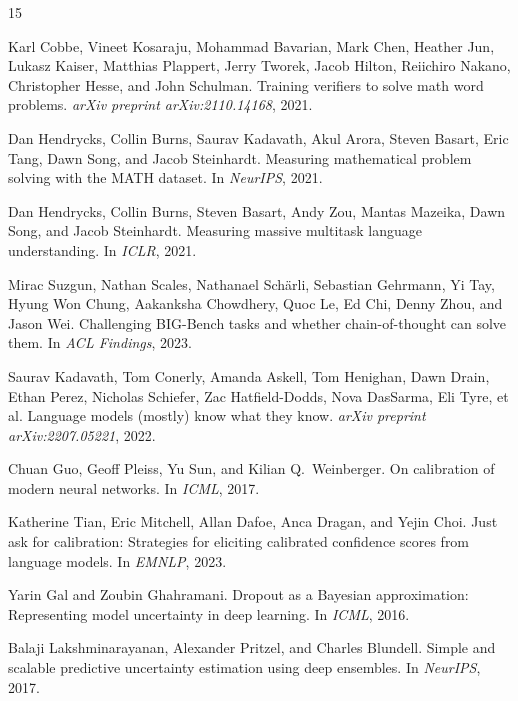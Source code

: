 \documentclass{article}
\begin{document}
\begin{thebibliography}{15}

Karl Cobbe, Vineet Kosaraju, Mohammad Bavarian, Mark Chen, Heather Jun, Lukasz Kaiser, Matthias Plappert, Jerry Tworek, Jacob Hilton, Reiichiro Nakano, Christopher Hesse, and John Schulman.
\newblock Training verifiers to solve math word problems.
\newblock \emph{arXiv preprint arXiv:2110.14168}, 2021.

Dan Hendrycks, Collin Burns, Saurav Kadavath, Akul Arora, Steven Basart, Eric Tang, Dawn Song, and Jacob Steinhardt.
\newblock Measuring mathematical problem solving with the MATH dataset.
\newblock In \emph{NeurIPS}, 2021.

Dan Hendrycks, Collin Burns, Steven Basart, Andy Zou, Mantas Mazeika, Dawn Song, and Jacob Steinhardt.
\newblock Measuring massive multitask language understanding.
\newblock In \emph{ICLR}, 2021.

Mirac Suzgun, Nathan Scales, Nathanael Sch{\"a}rli, Sebastian Gehrmann, Yi Tay, Hyung Won Chung, Aakanksha Chowdhery, Quoc Le, Ed Chi, Denny Zhou, and Jason Wei.
\newblock Challenging BIG-Bench tasks and whether chain-of-thought can solve them.
\newblock In \emph{ACL Findings}, 2023.

Saurav Kadavath, Tom Conerly, Amanda Askell, Tom Henighan, Dawn Drain, Ethan Perez, Nicholas Schiefer, Zac Hatfield-Dodds, Nova DasSarma, Eli Tyre, et al.
\newblock Language models (mostly) know what they know.
\newblock \emph{arXiv preprint arXiv:2207.05221}, 2022.

Chuan Guo, Geoff Pleiss, Yu Sun, and Kilian Q.\ Weinberger.
\newblock On calibration of modern neural networks.
\newblock In \emph{ICML}, 2017.

Katherine Tian, Eric Mitchell, Allan Dafoe, Anca Dragan, and Yejin Choi.
\newblock Just ask for calibration: Strategies for eliciting calibrated confidence scores from language models.
\newblock In \emph{EMNLP}, 2023.

Yarin Gal and Zoubin Ghahramani.
\newblock Dropout as a Bayesian approximation: Representing model uncertainty in deep learning.
\newblock In \emph{ICML}, 2016.

Balaji Lakshminarayanan, Alexander Pritzel, and Charles Blundell.
\newblock Simple and scalable predictive uncertainty estimation using deep ensembles.
\newblock In \emph{NeurIPS}, 2017.


\end{thebibliography}
\end{document}
